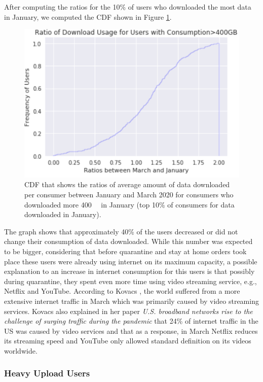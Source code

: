 \documentclass[conference,10pt]{IEEEtran}
\begin{document}
After computing the ratios for the 10\% of users who downloaded the most data in January, we computed the CDF shown in Figure \ref{fig:heavydown}.

\begin{figure}
\centering
\includegraphics[width=1.0\linewidth]{figs/heavydown.PNG}
\caption{CDF that shows the ratios of average amount of data downloaded per consumer between January and March 2020 for consumers who downloaded more \SI{400}{\giga\byte} in January (top 10\% of consumers for data downloaded in January).}
\label{fig:heavydown}
\end{figure}

The graph shows that approximately 40\% of the users decreased or did not change their consumption of data downloaded. While this number was expected to be bigger, considering that before quarantine and stay at home orders took place these users were already using internet on its maximum capacity, a possible explanation to an increase in internet consumption for this users is that possibly during quarantine, they spent even more time using video streaming service, e.g., Netflix and YouTube. According to Kovacs \cite{kovacs}, the world suffered from a more extensive internet traffic in March which was primarily caused by video streaming services. Kovacs also explained in her paper \textit{U.S. broadband networks rise to the challenge of surging traffic during the pandemic} that 24\% of internet traffic in the US was caused by video services and that as a response, in March Netflix reduces its streaming speed and YouTube only allowed standard definition on its videos worldwide.

\subsubsection{Heavy Upload Users}
\label{sec:heavy-upload-users}
\end{document}
